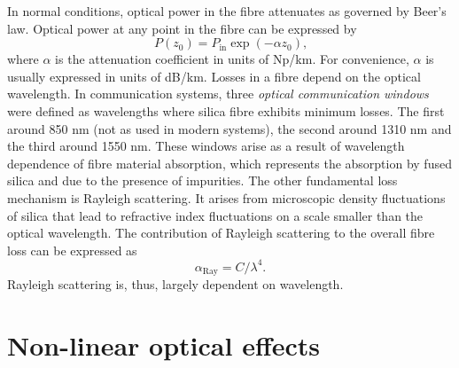 \documentclass{standalone}
\begin{document}
In normal conditions, optical power in the fibre attenuates as governed by Beer's law. Optical power at any point in the fibre can be expressed by
\begin{equation}
P(z_0) = P_\textrm{in} \exp\left(-\alpha z_0\right) \textrm{,}
\end{equation}
where $\alpha$ is the attenuation coefficient in units of Np/km. For convenience, $\alpha$ is usually expressed in units of dB/km. Losses in a fibre depend on the optical wavelength. In communication systems, three \emph{optical communication windows} were defined as wavelengths where silica fibre exhibits minimum losses. The first around 850 nm (not as used in modern systems), the second around 1310 nm and the third around 1550 nm. These windows arise as a result of wavelength dependence of fibre material absorption, which represents the absorption by fused silica and due to the presence of impurities. The other fundamental loss mechanism is Rayleigh scattering. It arises from microscopic density fluctuations of silica that lead to refractive index fluctuations on a scale smaller than the optical wavelength. The contribution of Rayleigh scattering to the overall fibre loss can be expressed as
\begin{equation}
\alpha_\textrm{Ray} = C / \lambda^4 \textrm{.}
\end{equation}
Rayleigh scattering is, thus, largely dependent on wavelength. \\


\section{Non-linear optical effects}







\setcounter{stranica}{\thepage}
\addtocounter{stranica}{1}
\end{document}
